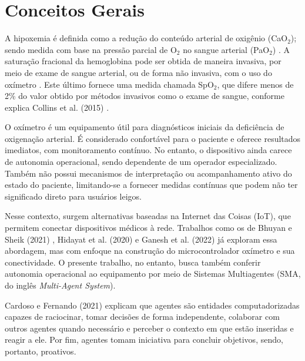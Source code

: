 \section{Conceitos Gerais} \label{sec:concepts}
A hipoxemia é definida como a redução do conteúdo arterial de oxigênio (CaO$_2$); sendo medida com base na pressão parcial de O$_2$ no sangue arterial (PaO$_2$) \cite{fortis2000hipoxemia}. A saturação fracional da hemoglobina pode ser obtida de maneira invasiva, por meio de exame de sangue arterial, ou de forma não invasiva, com o uso do oxímetro \cite{collins2015relating}. Este último fornece uma medida chamada SpO$_2$, que difere menos de 2\% do valor obtido por métodos invasivos como o exame de sangue, conforme explica Collins et al. (2015) \cite{collins2015relating}.

O oxímetro é um equipamento útil para diagnósticos iniciais da deficiência de oxigenação arterial. É considerado confortável para o paciente e oferece resultados imediatos, com monitoramento contínuo. No entanto, o dispositivo ainda carece de autonomia operacional, sendo dependente de um operador especializado. Também não possui mecanismos de interpretação ou acompanhamento ativo do estado do paciente, limitando-se a fornecer medidas contínuas que podem não ter significado direto para usuários leigos.

Nesse contexto, surgem alternativas baseadas na Internet das Coisas (IoT), que permitem conectar dispositivos médicos à rede. Trabalhos como os de Bhuyan e Sheik (2021) \cite{bhuyan2021designing}, Hidayat et al. (2020) \cite{hidayat2020designing} e 
Ganesh et al. (2022) \cite{ganesh2022iot} já exploram essa abordagem, mas com enfoque na construção do microcontrolador oxímetro e sua conectividade. O presente trabalho, no entanto, busca também conferir autonomia operacional ao equipamento por meio de Sistemas Multiagentes (SMA, do inglês \textit{Multi-Agent System}). 

Cardoso e Fernando (2021) \cite{cardoso2021review} explicam que agentes são entidades computadorizadas capazes de raciocinar, tomar decisões de forma independente, colaborar com outros agentes quando necessário e perceber o contexto em que estão inseridas e reagir a ele. Por fim, agentes tomam iniciativa para concluir objetivos, sendo, portanto, proativos.

